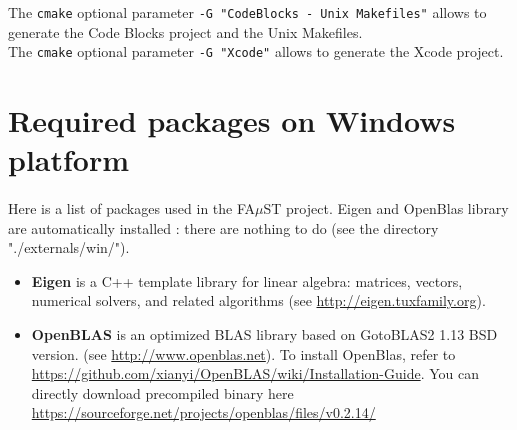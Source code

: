 The \texttt{cmake} optional parameter \texttt{-G "CodeBlocks - Unix Makefiles"} allows to generate the Code Blocks project and the Unix Makefiles.\\ 
The \texttt{cmake} optional parameter \texttt{-G "Xcode"} allows to generate the Xcode project. 






\section{Required packages on Windows platform}\label{sec:WinRequiredPackages}
\paragraph{}Here is a list of packages used in the FA$\mu$ST project. Eigen and OpenBlas library are automatically installed : there are nothing to do (see the directory "./externals/win/").
\begin{itemize}
\item \textbf{Eigen} is a C++ template library for linear algebra: matrices, vectors, numerical solvers, and related algorithms (see \url{http://eigen.tuxfamily.org}).
\item \textbf{OpenBLAS} is an optimized BLAS library based on GotoBLAS2 1.13 BSD version. (see \url{http://www.openblas.net}). To install OpenBlas, refer to \url{https://github.com/xianyi/OpenBLAS/wiki/Installation-Guide}. You can directly download precompiled binary here \url{https://sourceforge.net/projects/openblas/files/v0.2.14/}
\end{itemize}



